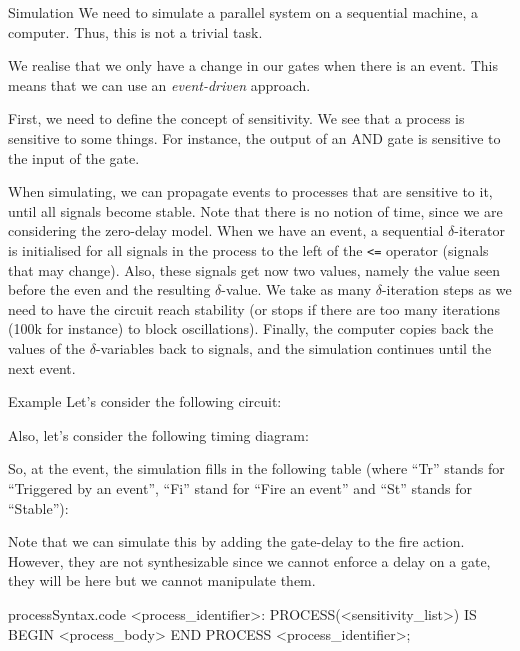 \documentclass[a4paper]{article}
\begin{document}
\begin{parag}{Simulation}
    We need to simulate a parallel system on a sequential machine, a computer. Thus, this is not a trivial task.

    We realise that we only have a change in our gates when there is an event. This means that we can use an \textit{event-driven} approach.

    First, we need to define the concept of sensitivity. We see that a process is sensitive to some things. For instance, the output of an AND gate is sensitive to the input of the gate.

    When simulating, we can propagate events to processes that are sensitive to it, until all signals become stable. Note that there is no notion of time, since we are considering the zero-delay model. When we have an event, a sequential $\delta$-iterator is initialised for all signals in the process to the left of the \texttt{<=} operator (signals that may change). Also, these signals get now two values, namely the value seen before the even and the resulting $\delta$-value. We take as many $\delta$-iteration steps as we need to have the circuit reach stability (or stops if there are too many iterations (100k for instance) to block oscillations). Finally, the computer copies back the values of the $\delta$-variables back to signals, and the simulation continues until the next event.

    \begin{subparag}{Example}
        Let's consider the following circuit:

        Also, let's consider the following timing diagram:

        So, at the event, the simulation fills in the following table (where ``Tr'' stands for ``Triggered by an event'', ``Fi'' stand for ``Fire an event'' and ``St'' stands for ``Stable''): 
    \end{subparag}

    Note that we can simulate this by adding the gate-delay to the fire action. However, they are not synthesizable since we cannot enforce a delay on a gate, they will be here but we cannot manipulate them.
\end{parag}

\begin{filecontents*}[overwrite]{processSyntax.code}
<process_identifier>: PROCESS(<sensitivity_list>) IS
BEGIN 
    <process_body>
END PROCESS <process_identifier>;
\end{filecontents*}
\end{document}
